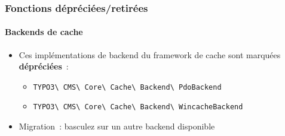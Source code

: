 %

\begin{frame}[fragile]
	\frametitle{Fonctions dépréciées/retirées}
	\framesubtitle{Backends de cache}


	\begin{itemize}
		\item Ces implémentations de backend du framework de cache sont marquées \textbf{dépréciées}~:
			\begin{itemize}\small
				\item
					\texttt{TYPO3\textbackslash
						CMS\textbackslash
						Core\textbackslash
						Cache\textbackslash
						Backend\textbackslash
						PdoBackend}
				\item \texttt{TYPO3\textbackslash
						CMS\textbackslash
						Core\textbackslash
						Cache\textbackslash
						Backend\textbackslash
						WincacheBackend}
			\end{itemize}\normalsize
		\item Migration~: basculez sur un autre backend disponible
	\end{itemize}

\end{frame}

